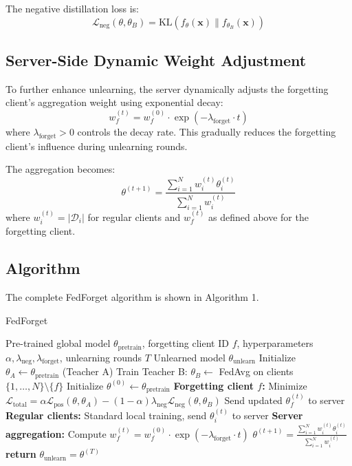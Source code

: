 \documentclass[11pt,a4paper]{article}
\begin{document}
The negative distillation loss is:
\begin{equation}
\mathcal{L}_{\text{neg}}(\theta, \theta_B) = \text{KL}(f_\theta(\mathbf{x}) \| f_{\theta_B}(\mathbf{x}))
\end{equation}

\subsection{Server-Side Dynamic Weight Adjustment}

To further enhance unlearning, the server dynamically adjusts the forgetting client's aggregation weight using exponential decay:
\begin{equation}
w_f^{(t)} = w_f^{(0)} \cdot \exp(-\lambda_{\text{forget}} \cdot t)
\end{equation}
where $\lambda_{\text{forget}} > 0$ controls the decay rate. This gradually reduces the forgetting client's influence during unlearning rounds.

The aggregation becomes:
\begin{equation}
\theta^{(t+1)} = \frac{\sum_{i=1}^{N} w_i^{(t)} \theta_i^{(t)}}{\sum_{i=1}^{N} w_i^{(t)}}
\end{equation}
where $w_i^{(t)} = |\mathcal{D}_i|$ for regular clients and $w_f^{(t)}$ as defined above for the forgetting client.

\subsection{Algorithm}

The complete FedForget algorithm is shown in Algorithm 1.

\begin{algorithm}
\caption{FedForget}
\begin{algorithmic}[1]
\REQUIRE Pre-trained global model $\theta_{\text{pretrain}}$, forgetting client ID $f$, hyperparameters $\alpha, \lambda_{\text{neg}}, \lambda_{\text{forget}}$, unlearning rounds $T$
\ENSURE Unlearned model $\theta_{\text{unlearn}}$
\STATE Initialize $\theta_A \leftarrow \theta_{\text{pretrain}}$ (Teacher A)
\STATE Train Teacher B: $\theta_B \leftarrow$ FedAvg on clients $\{1,\ldots,N\}\setminus\{f\}$
\STATE Initialize $\theta^{(0)} \leftarrow \theta_{\text{pretrain}}$
    \STATE \textbf{Forgetting client $f$:}
    \STATE \quad Minimize $\mathcal{L}_{\text{total}} = \alpha \mathcal{L}_{\text{pos}}(\theta, \theta_A) - (1-\alpha) \lambda_{\text{neg}} \mathcal{L}_{\text{neg}}(\theta, \theta_B)$
    \STATE \quad Send updated $\theta_f^{(t)}$ to server
    \STATE \textbf{Regular clients:}
    \STATE \quad Standard local training, send $\theta_i^{(t)}$ to server
    \STATE \textbf{Server aggregation:}
    \STATE \quad Compute $w_f^{(t)} = w_f^{(0)} \cdot \exp(-\lambda_{\text{forget}} \cdot t)$
    \STATE \quad $\theta^{(t+1)} = \frac{\sum_{i=1}^{N} w_i^{(t)} \theta_i^{(t)}}{\sum_{i=1}^{N} w_i^{(t)}}$
\ENDFOR
\STATE \textbf{return} $\theta_{\text{unlearn}} = \theta^{(T)}$
\end{algorithmic}
\end{algorithm}
\end{document}
